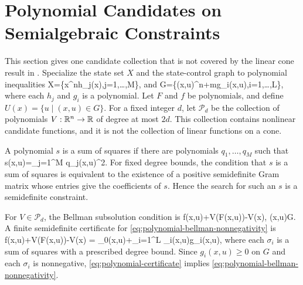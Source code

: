 \documentclass{article}
\begin{document}
\section{Polynomial Candidates on Semialgebraic Constraints}

This section gives one candidate collection that is not covered by the linear cone result in \cite{pates-rantzer-cdc}. Specialize the state set $X$ and the state-control graph to polynomial inequalities
\BEQ
X=\{x\in\reals^n\mid h_j(x),\quad j=1,\ldots,M\},
\label{eq:polynomial-state-set}
\EEQ
and
\BEQ
G=\{(x,u)\in\reals^{n+m}\mid g_i(x,u),\quad i=1,\ldots,L\},
\label{eq:semialgebraic-graph}
\EEQ
where each $h_j$ and $g_i$ is a polynomial. Let $F$ and $f$ be polynomials, and define $U(x)=\{u\mid (x,u)\in G\}$. For a fixed integer $d$, let $\mathcal P_d$ be the collection of polynomials $V:\mathbb{R}^n\rightarrow\mathbb{R}$ of degree at most $2d$. This collection contains nonlinear candidate functions, and it is not the collection of linear functions on a cone.

A polynomial $s$ is a sum of squares if there are polynomials $q_1,\ldots,q_M$ such that
\BEQ
s(x,u)=\sum_{j=1}^M q_j(x,u)^2.
\label{eq:sum-of-squares-definition}
\EEQ
For fixed degree bounds, the condition that $s$ is a sum of squares is equivalent to the existence of a positive semidefinite Gram matrix whose entries give the coefficients of $s$. Hence the search for such an $s$ is a semidefinite constraint.

For $V\in\mathcal P_d$, the Bellman subsolution condition is
\BEQ
f(x,u)+\gamma V(F(x,u))-V(x),
\quad (x,u)\in G.
\label{eq:polynomial-bellman-nonnegativity}
\EEQ
A finite semidefinite certificate for \eqref{eq:polynomial-bellman-nonnegativity} is
\BEQ
f(x,u)+\gamma V(F(x,u))-V(x)
=
\sigma_0(x,u)+\sum_{i=1}^L \sigma_i(x,u)g_i(x,u),
\label{eq:polynomial-certificate}
\EEQ
where each $\sigma_i$ is a sum of squares with a prescribed degree bound. Since $g_i(x,u)\geq 0$ on $G$ and each $\sigma_i$ is nonnegative, \eqref{eq:polynomial-certificate} implies \eqref{eq:polynomial-bellman-nonnegativity}.
\end{document}
